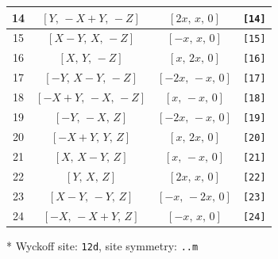 \documentclass[fleqn,8pt]{jsarticle}
\begin{document}
\begin{longtable}{cccc}
14 & $\left[ Y,\, - X + Y,\, - Z \right]$ & $\left[ 2 x,\, x,\, 0 \right]$ & {\tt [14]} \\ \hline
15 & $\left[ X - Y,\, X,\, - Z \right]$ & $\left[ - x,\, x,\, 0 \right]$ & {\tt [15]} \\ \hline
16 & $\left[ X,\, Y,\, - Z \right]$ & $\left[ x,\, 2 x,\, 0 \right]$ & {\tt [16]} \\ \hline
17 & $\left[ - Y,\, X - Y,\, - Z \right]$ & $\left[ - 2 x,\, - x,\, 0 \right]$ & {\tt [17]} \\ \hline
18 & $\left[ - X + Y,\, - X,\, - Z \right]$ & $\left[ x,\, - x,\, 0 \right]$ & {\tt [18]} \\ \hline
19 & $\left[ - Y,\, - X,\, Z \right]$ & $\left[ - 2 x,\, - x,\, 0 \right]$ & {\tt [19]} \\ \hline
20 & $\left[ - X + Y,\, Y,\, Z \right]$ & $\left[ x,\, 2 x,\, 0 \right]$ & {\tt [20]} \\ \hline
21 & $\left[ X,\, X - Y,\, Z \right]$ & $\left[ x,\, - x,\, 0 \right]$ & {\tt [21]} \\ \hline
22 & $\left[ Y,\, X,\, Z \right]$ & $\left[ 2 x,\, x,\, 0 \right]$ & {\tt [22]} \\ \hline
23 & $\left[ X - Y,\, - Y,\, Z \right]$ & $\left[ - x,\, - 2 x,\, 0 \right]$ & {\tt [23]} \\ \hline
24 & $\left[ - X,\, - X + Y,\, Z \right]$ & $\left[ - x,\, x,\, 0 \right]$ & {\tt [24]} \\
\end{longtable}
* Wyckoff site: {\tt 12d}, site symmetry: {\tt ..m}
\renewcommand{\arraystretch}{1.2}
\end{document}
